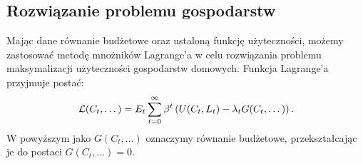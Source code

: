 \subsection{Rozwiązanie problemu gospodarstw}
\label{sec:solve_household}

Mając dane równanie budżetowe oraz ustaloną funkcję użyteczności, możemy zastosować metodę mnożników Lagrange'a w celu rozwiązania problemu maksymalizacji użyteczności gospodarstw domowych. Funkcja Lagrange'a przyjmuje postać:
\begin{equation}
    \mathcal{L}(C_t, \dots) = E_t \sum_{t=0}^{\infty} \beta^t \left(U(C_t, L_t) - \lambda_t G(C_t, \dots)\right).
\end{equation}
W powyższym jako $G(C_t, \dots)$ oznaczymy równanie budżetowe, przekształcając je do postaci $G(C_t, \dots) = 0$.

